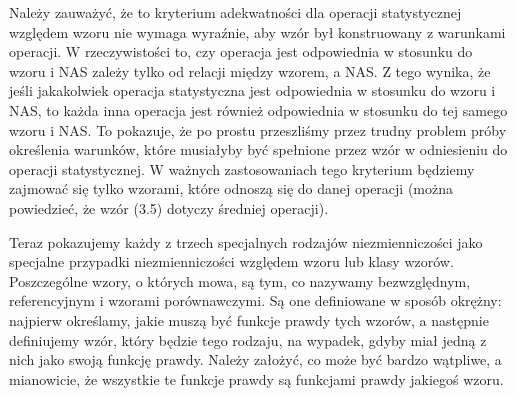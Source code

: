 \documentclass[12pt,a4paper]{report}
\begin{document}
Należy zauważyć, że to kryterium adekwatności dla operacji statystycznej względem wzoru nie wymaga wyraźnie, aby wzór był konstruowany z warunkami operacji. W rzeczywistości to, czy operacja jest odpowiednia w stosunku do wzoru i NAS zależy tylko od relacji między wzorem, a NAS. Z tego wynika, że jeśli jakakolwiek operacja statystyczna jest odpowiednia w stosunku do wzoru i NAS, to każda inna operacja jest również odpowiednia w stosunku do tej samego wzoru i NAS. To pokazuje, że po prostu przeszliśmy przez trudny problem próby określenia warunków, które musiałyby być spełnione przez wzór w odniesieniu do operacji statystycznej. W ważnych zastosowaniach tego kryterium będziemy zajmować się tylko wzorami, które odnoszą się do danej operacji (można powiedzieć, że wzór (3.5) dotyczy średniej operacji).

Teraz pokazujemy każdy z trzech specjalnych rodzajów niezmienniczości jako specjalne przypadki niezmienniczości względem wzoru lub klasy wzorów. Poszczególne wzory, o których mowa, są tym, co nazywamy bezwzględnym, referencyjnym i wzorami porównawczymi. Są one definiowane w sposób okrężny: najpierw określamy, jakie muszą być funkcje prawdy tych wzorów, a następnie definiujemy wzór, który będzie tego rodzaju, na wypadek, gdyby miał jedną z nich jako swoją funkcję prawdy. Należy założyć, co może być bardzo wątpliwe, a mianowicie, że wszystkie te funkcje prawdy są funkcjami prawdy jakiegoś wzoru.
\end{document}
